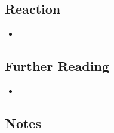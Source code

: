 \documentclass{article}
\begin{document}
\subsection*{Reaction}
\begin{itemize}
\item 
\end{itemize}

\subsection*{Further Reading}
\begin{itemize}
	\item 
\end{itemize}

\subsection*{Notes}
\end{document}
